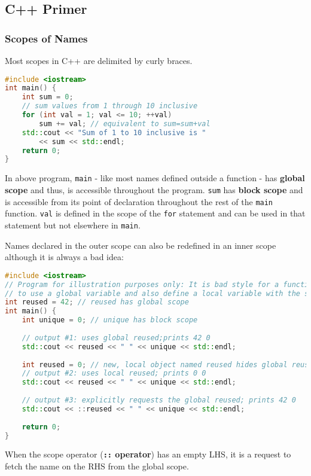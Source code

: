 \subsection{C++ Primer}
\label{task:20231115_cpp}

\subsubsection{Scopes of Names}

Most scopes in C++ are delimited by curly braces.
\begin{lstlisting}[language=C++]
#include <iostream> 
int main() { 
    int sum = 0; 
    // sum values from 1 through 10 inclusive 
    for (int val = 1; val <= 10; ++val) 
        sum += val; // equivalent to sum=sum+val 
    std::cout << "Sum of 1 to 10 inclusive is " 
        << sum << std::endl; 
    return 0; 
}
\end{lstlisting}
In above program, \texttt{main} - like most names defined outside a function - has \textbf{global scope} and thus, is accessible throughout the program. \texttt{sum} has \textbf{block scope} and is accessible from its point of declaration throughout the rest of the \texttt{main} function. \texttt{val} is defined in the scope of the \texttt{for} statement and can be used in that statement but not elsewhere in \texttt{main}.

Names declared in the outer scope can also be redefined in an inner scope although it is always a bad idea:
\begin{lstlisting}[language=C++]
#include <iostream> 
// Program for illustration purposes only: It is bad style for a function 
// to use a global variable and also define a local variable with the same name 
int reused = 42; // reused has global scope
int main() { 
    int unique = 0; // unique has block scope 
    
    // output #1: uses global reused;prints 42 0 
    std::cout << reused << " " << unique << std::endl; 
    
    int reused = 0; // new, local object named reused hides global reused 
    // output #2: uses local reused; prints 0 0 
    std::cout << reused << " " << unique << std::endl; 
    
    // output #3: explicitly requests the global reused; prints 42 0 
    std::cout << ::reused << " " << unique << std::endl; 
    
    return 0;
}
\end{lstlisting}
When the scope operator (\textbf{\texttt{::} operator}) has an empty LHS, it is a request to fetch the name on the RHS from the global scope.

